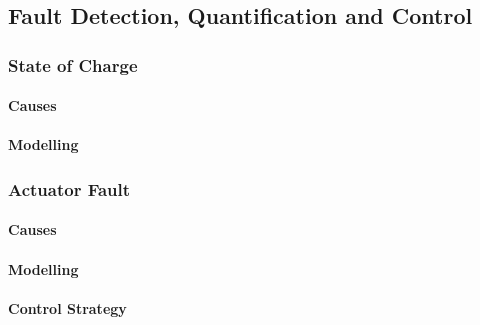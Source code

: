 \subsection{Fault Detection, Quantification and Control}
\subsubsection{State of Charge}
\paragraph{Causes}
\paragraph{Modelling}

\subsubsection{Actuator Fault}
\paragraph{Causes}
\paragraph{Modelling}
\paragraph{Control Strategy}